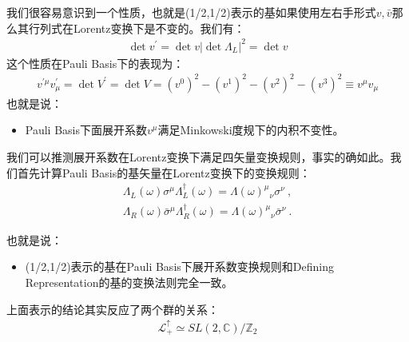 \bigskip
{}

我们很容易意识到一个性质，也就是(1/2,1/2)表示的基如果使用左右手形式$ v, \bar{v} $那么其行列式在Lorentz变换下是不变的。我们有：
\begin{align}
  \det v^{\prime}=\det v|\det\Lambda_L|^2=\det v
\end{align}
这个性质在Pauli Basis下的表现为：
\begin{align}
  v^{\prime\mu}v_\mu^{\prime}=\det V^{\prime}=\det
  V=(v^0)^2-(v^1)^2-(v^2)^2-(v^3)^2\equiv v^\mu v_\mu
\end{align}
也就是说：
\begin{itemize}
  \item Pauli Basis下面展开系数$ v^\mu $满足Minkowski度规下的内积不变性。
\end{itemize}

\bigskip
{}

我们可以推测展开系数在Lorentz变换下满足四矢量变换规则，事实的确如此。我们首先计算Pauli Basis的基矢量在Lorentz变换下的变换规则：
\begin{align}
  \Lambda_L(\omega)\sigma^\mu\Lambda_L^\dagger(\omega)=\Lambda(\omega)^\mu{}_\nu
  \sigma^\nu\mathrm{~,} \\
  \Lambda_R(\omega)\bar{\sigma}^\mu\Lambda_R^\dagger(\omega)=\Lambda(\omega)^\mu{}_\nu
  \bar{\sigma}^\nu\mathrm{~.}
\end{align}

也就是说：
\begin{itemize}
  \item (1/2,1/2)表示的基在Pauli Basis下展开系数变换规则和Defining Representation的基的变换法则完全一致。
\end{itemize}

\bigskip
{}

上面表示的结论其实反应了两个群的关系：
\begin{align}
  \mathscr{L}_+^\uparrow\simeq SL(2,\mathbb{C})/\mathbb{Z}_2
\end{align}

